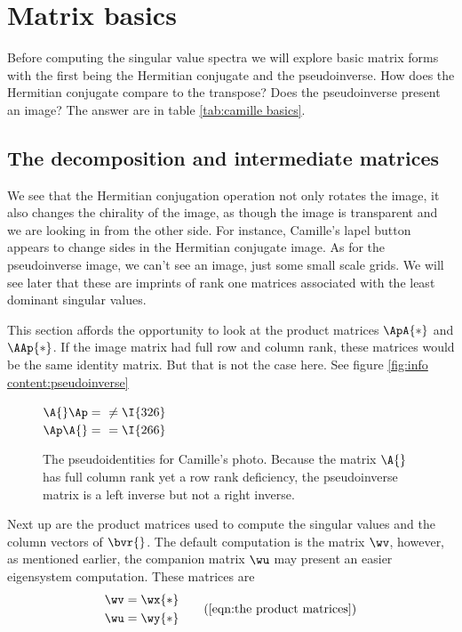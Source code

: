 \section[Matrix basics]{Matrix basics}
Before computing the singular value spectra we will explore basic matrix forms with the first being the Hermitian conjugate and the pseudoinverse. How does the Hermitian conjugate compare to the transpose? Does the pseudoinverse present an image? The answer are in table \eqref{tab:camille basics}.

\subsection{The decomposition and intermediate matrices}
We see that the Hermitian conjugation operation not only rotates the image, it also changes the chirality of the image, as though the image is transparent and we are looking in from the other side. For instance, Camille's lapel button appears to change sides in the Hermitian conjugate image. As for the pseudoinverse image, we can't see an image, just some small scale grids.  We will see later that these are imprints of rank one matrices associated with the least dominant singular values.  

%
This section affords the opportunity to look at the product matrices $\ApA{*}$ and $\AAp{*}$. If the image matrix had full row and column rank, these matrices would be the same identity matrix. But that is not the case here. See figure \eqref{fig:info content:pseudoinverse}
%
\begin{figure}[htbp] %
   \centering
   $\A{}\Ap = \, $
   $ \ne \I{326}$    \\[20pt]
   $\Ap \A{} = \, $
   $ = \I{266}$
   \caption[The pseudoidentities for Camille's photo]{The pseudoidentities for Camille's photo. Because the matrix $\A{}$ has full column rank yet a row rank deficiency, the pseudoinverse matrix is a left inverse but not a right inverse.} 
   \label{fig:info content:pseudoinverse}
\end{figure}

Next up are the product matrices used to compute the singular values and the column vectors of $\bvr{}$. The default computation is the matrix $\wv$, however, as mentioned earlier, the companion matrix $\wu$ may present an easier eigensystem computation. These matrices are
\begin{equation}
  \begin{split}
    \wv &= \wx{*} \\
    \wu &= \wy{*}
  \end{split}
  \tag{\ref{eqn:the product matrices}}
\end{equation}



